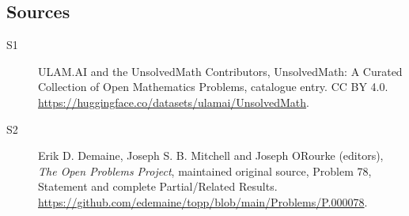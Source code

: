 \documentclass[11pt]{article}
\begin{document}
\subsection{Sources}
\begin{description}
\item[\hypertarget{source:statement:1}{S1}] ULAM.AI and the UnsolvedMath Contributors, UnsolvedMath: A Curated Collection of Open Mathematics Problems, catalogue entry. CC BY 4.0. \url{https://huggingface.co/datasets/ulamai/UnsolvedMath}.
\item[\hypertarget{source:statement:2}{S2}] Erik D. Demaine, Joseph S. B. Mitchell and Joseph O\textquotesingle Rourke (editors), \emph{The Open Problems Project}, maintained original source, Problem 78, Statement and complete Partial/Related Results. \url{https://github.com/edemaine/topp/blob/main/Problems/P.000078}.
\end{description}
\label{end:statement}
\end{document}
